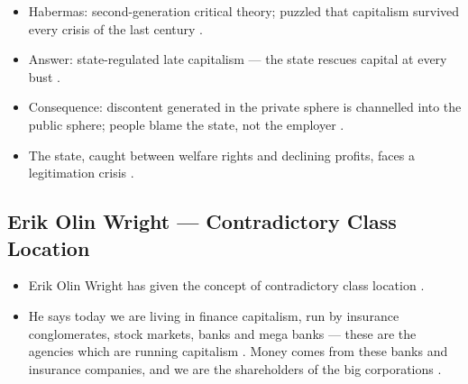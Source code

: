 \begin{QuickRevision}
\begin{itemize}
    \item Habermas: second-generation critical theory; puzzled that capitalism survived every crisis of the last century .
    \item Answer: state-regulated late capitalism --- the state rescues capital at every bust .
    \item Consequence: discontent generated in the private sphere is channelled into the public sphere; people blame the state, not the employer .
    \item The state, caught between welfare rights and declining profits, faces a legitimation crisis .
\end{itemize}
\end{QuickRevision}

\subsection{Erik Olin Wright --- Contradictory Class Location}
\begin{itemize}
    \item Erik Olin Wright has given the concept of contradictory class location .
    \item He says today we are living in finance capitalism, run by insurance conglomerates, stock markets, banks and mega banks --- these are the agencies which are running capitalism . Money comes from these banks and insurance companies, and we are the shareholders of the big corporations .
\end{itemize}

